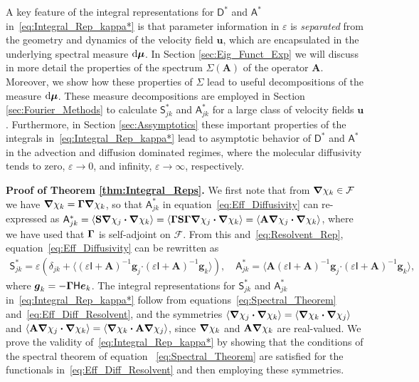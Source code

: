 \documentclass[leqno,onefignum,onetabnum]{siamltex1213}
\renewcommand{\d}{\mathrm{d}}
\newcommand{\Sb}{\mathbf{S}}
\newcommand{\Ab}{\mathbf{A}}
\newcommand{\Fc}{\mathcal{F}}
\newcommand{\Dm}{\mathsf{D}}
\newcommand{\Hm}{\mathsf{H}}
\newcommand{\Sm}{\mathsf{S}}
\newcommand{\Am}{\mathsf{A}}
\newcommand{\Ib}{\mathsf{I}}
\newcommand\bmu{\mbox{\boldmath${\mu}$}}
\newcommand\bGamma{\mbox{\boldmath${\Gamma}$}}
\newcommand\bnabla{\mbox{\boldmath${\nabla}$}}
\providecommand\bcdot{\boldsymbol{\cdot}}
\newcommand{\vecg}{\boldsymbol{g}}
\newcommand{\vecu}{\boldsymbol{u}}
\newcommand{\vece}{\boldsymbol{e}}
\begin{document}
A key feature of the integral representations for $\Dm^*$ and
$\Am^*$ in~\eqref{eq:Integral_Rep_kappa*} is that parameter
information in $\varepsilon$ is \emph{separated} from the geometry and dynamics
of the velocity field $\vecu $, which are encapsulated in the
underlying spectral measure $\d\bmu$. In Section
\ref{sec:Eig_Funct_Exp} we will discuss in more detail the properties
of the spectrum $\Sigma(\Ab)$ of the operator $\Ab$. Moreover, we show how
these properties of $\Sigma$ lead to useful decompositions of the
measure $\d\bmu$. These measure decompositions are employed in Section 
\ref{sec:Fourier_Methods} to calculate $\Sm^*_{jk}$ and $\Am^*_{jk}$ for a
large class of velocity fields $\vecu $. Furthermore, in Section
\ref{sec:Assymptotics} these important properties of the integrals
in~\eqref{eq:Integral_Rep_kappa*} lead to asymptotic behavior of 
$\Dm^*$ and $\Am^*$ in the advection and diffusion dominated
regimes, where the molecular diffusivity tends to zero, $\varepsilon\to0$, and
infinity, $\varepsilon\to\infty$, respectively.      



\textbf{Proof of Theorem \ref{thm:Integral_Reps}.}\hspace{1ex}
%
We first note that from $\bnabla \chi_k\in\Fc$ we have 
$\bnabla \chi_k=\bGamma\bnabla \chi_k$, so that $\Am^*_{jk}$ in
equation~\eqref{eq:Eff_Diffusivity} can re-expressed as 
$\Am^*_{jk}=\langle\Sb\bnabla \chi_j\bcdot\bnabla \chi_k\rangle=\langle\bGamma\Sb\bGamma\bnabla \chi_j\bcdot\bnabla \chi_k\rangle  
=\langle\Ab\bnabla \chi_j\bcdot\bnabla \chi_k\rangle$, where we have used that $\bGamma$ is
self-adjoint on $\Fc$. From this and~\eqref{eq:Resolvent_Rep},
equation~\eqref{eq:Eff_Diffusivity} can be rewritten as
%
\begin{align}\label{eq:Eff_Diff_Resolvent}
 \Sm^*_{jk}=\varepsilon\left(\delta_{jk}+\langle(\varepsilon\Ib+\Ab)^{-1}\vecg_j\bcdot(\varepsilon\Ib+\Ab)^{-1}\vecg_k\rangle\right), \quad
 \Am^*_{jk}=\langle\Ab(\varepsilon\Ib+\Ab)^{-1}\vecg_j\bcdot(\varepsilon\Ib+\Ab)^{-1}\vecg_k\rangle,
\end{align}
%
where $\vecg_k=-\bGamma\Hm\vece _k$. The integral representations
for $\Sm^*_{jk}$ and $\Am^*_{jk}$ in~\eqref{eq:Integral_Rep_kappa*} follow
from equations~\eqref{eq:Spectral_Theorem}
and~\eqref{eq:Eff_Diff_Resolvent}, and the symmetries 
$\langle\bnabla \chi_j\bcdot\bnabla \chi_k\rangle=\langle\bnabla \chi_k\bcdot\bnabla \chi_j\rangle$ and 
$\langle\Ab\bnabla \chi_j\bcdot\bnabla \chi_k\rangle=\langle\bnabla \chi_k\bcdot\Ab\bnabla \chi_j\rangle$, since
$\bnabla \chi_k$ and $\Ab\bnabla \chi_k$ are real-valued. We prove the
validity of~\eqref{eq:Integral_Rep_kappa*} by showing that the
conditions of the spectral theorem of equation
~\eqref{eq:Spectral_Theorem} are satisfied for the functionals
in~\eqref{eq:Eff_Diff_Resolvent} and then employing these symmetries.     
\end{document}
